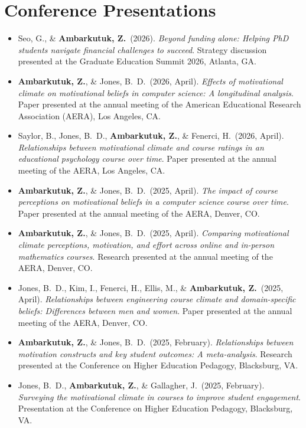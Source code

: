 \documentclass[letterpaper,11pt]{article}
\newenvironment{refs}%
  {\begin{itemize}[leftmargin=2.2em, labelwidth=1.8em, labelsep=0.4em, align=left,
                   itemsep=3pt, parsep=0pt, topsep=2pt]}%
  {\end{itemize}}
\newcommand{\me}{\textbf{Ambarkutuk, Z.}}
\begin{document}
\section{Conference Presentations}
\begin{refs}
  \item[{[13]}] Seo, G., \& \me\ (2026). \textit{Beyond funding alone: Helping PhD students navigate financial challenges to succeed}. Strategy discussion presented at the Graduate Education Summit 2026, Atlanta, GA.
  \item[{[12]}] \me, \& Jones, B.\ D.\ (2026, April). \textit{Effects of motivational climate on motivational beliefs in computer science: A longitudinal analysis}. Paper presented at the annual meeting of the American Educational Research Association (AERA), Los Angeles, CA.
  \item[{[11]}] Saylor, B., Jones, B.\ D., \me, \& Fenerci, H.\ (2026, April). \textit{Relationships between motivational climate and course ratings in an educational psychology course over time}. Paper presented at the annual meeting of the AERA, Los Angeles, CA.
  \item[{[10]}] \me, \& Jones, B.\ D.\ (2025, April). \textit{The impact of course perceptions on motivational beliefs in a computer science course over time}. Paper presented at the annual meeting of the AERA, Denver, CO.
  \item[{[9]}] \me, \& Jones, B.\ D.\ (2025, April). \textit{Comparing motivational climate perceptions, motivation, and effort across online and in-person mathematics courses}. Research presented at the annual meeting of the AERA, Denver, CO.
  \item[{[8]}] Jones, B.\ D., Kim, I., Fenerci, H., Ellis, M., \& \me\ (2025, April). \textit{Relationships between engineering course climate and domain-specific beliefs: Differences between men and women}. Paper presented at the annual meeting of the AERA, Denver, CO.
  \item[{[7]}] \me, \& Jones, B.\ D.\ (2025, February). \textit{Relationships between motivation constructs and key student outcomes: A meta-analysis}. Research presented at the Conference on Higher Education Pedagogy, Blacksburg, VA.
  \item[{[6]}] Jones, B.\ D., \me, \& Gallagher, J.\ (2025, February). \textit{Surveying the motivational climate in courses to improve student engagement}. Presentation at the Conference on Higher Education Pedagogy, Blacksburg, VA.

\end{refs}
\end{document}
